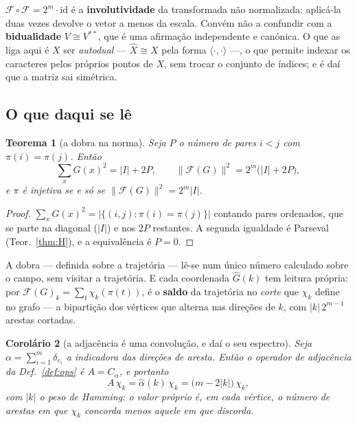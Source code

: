 \documentclass[11pt,a4paper]{article}
\newcommand{\abs}[1]{\lvert #1\rvert}
\newtheorem{teorema}{Teorema}
\newtheorem{corolario}[teorema]{Corolário}
\begin{document}
\medskip\noindent $\mathcal{F}\circ \mathcal{F}=2^{m}\cdot\mathrm{id}$ é a \textbf{involutividade} da
transformada não normalizada: aplicá-la duas vezes devolve o vetor a menos da
escala. Convém não a confundir com a \textbf{bidualidade} $V\cong V^{**}$, que é
uma afirmação independente e canónica. O que as liga aqui é $X$ ser
\emph{autodual} --- $\widehat X\cong X$ pela forma $\langle\cdot,\cdot\rangle$ ---,
o que permite indexar os caracteres pelos próprios pontos de $X$, sem trocar o
conjunto de índices; e é daí que a matriz sai simétrica.

\subsection*{O que daqui se lê}

\begin{teorema}[a dobra na norma]\label{thm:dobra-norma}
Seja $P$ o número de pares $i<j$ com $\pi(i)=\pi(j)$. Então
\[
\sum_x G(x)^2=\abs{I}+2P,
\qquad
\lVert \mathcal{F}(G)\rVert^{2}=2^{m}\bigl(\abs{I}+2P\bigr),
\]
e $\pi$ é injetiva se e só se $\lVert \mathcal{F}(G)\rVert^{2}=2^{m}\abs{I}$.
\end{teorema}

\begin{proof}
$\sum_x G(x)^2=\lvert\{(i,j):\pi(i)=\pi(j)\}\rvert$ contando pares ordenados, que
se parte na diagonal ($\abs{I}$) e nos $2P$ restantes. A segunda igualdade é
Parseval (Teor.~\ref{thm:H}), e a equivalência é $P=0$.
\end{proof}

\medskip\noindent A dobra --- definida sobre a trajetória --- lê-se num único
número calculado sobre o campo, sem visitar a trajetória. E cada coordenada
$\widehat{G}(k)$ tem leitura própria: por $\mathcal{F}(G)_k=\sum_t\chi_k(\pi(t))$, é o
\textbf{saldo} da trajetória no \emph{corte} que $\chi_k$ define no grafo --- a
bipartição dos vértices que alterna nas direções de $k$, com
$\lvert k\rvert\,2^{m-1}$ arestas cortadas.

\begin{corolario}[a adjacência é uma convolução, e daí o seu espectro]\label{cor:modos}
Seja $\alpha=\sum_{i=1}^{m}\delta_{e_i}$ a indicadora das direções de aresta.
Então o operador de adjacência da Def.~\ref{def:ops} é $A=C_\alpha$, e portanto
\[
A\,\chi_k=\widehat{\alpha}(k)\,\chi_k
=\bigl(m-2\lvert k\rvert\bigr)\,\chi_k ,
\]
com $\lvert k\rvert$ o peso de Hamming: o valor próprio é, em cada vértice, o
número de arestas em que $\chi_k$ \emph{concorda} menos aquele em que
\emph{discorda}.
\end{corolario}
\end{document}
